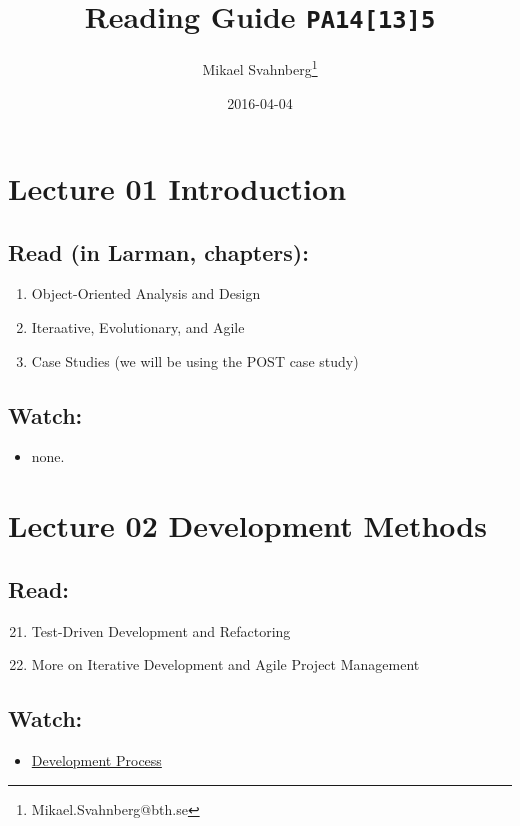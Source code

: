 \documentclass[10pt,t,a4paper]{article}
\author{Mikael Svahnberg\thanks{Mikael.Svahnberg@bth.se}}
\date{2016-04-04}
\title{Reading Guide \texttt{PA14[13]5}}
\begin{document}
\maketitle


\section{Lecture 01 Introduction}
\label{sec:orgheadline3}
\subsection{Read (in Larman, chapters):}
\label{sec:orgheadline1}
\begin{enumerate}
\item Object-Oriented Analysis and Design
\item Iteraative, Evolutionary, and Agile
\item Case Studies (we will be using the POST case study)
\end{enumerate}

\subsection{Watch:}
\label{sec:orgheadline2}
\begin{itemize}
\item none.
\end{itemize}
\section{Lecture 02 Development Methods}
\label{sec:orgheadline6}
\subsection{Read:}
\label{sec:orgheadline4}
\begin{enumerate}
\setcounter{enumi}{20}
\item Test-Driven Development and Refactoring
\setcounter{enumi}{39}
\item More on Iterative Development and Agile Project Management
\end{enumerate}

\subsection{Watch:}
\label{sec:orgheadline5}
\begin{itemize}
\item \href{https://play.bth.se/media/Development+Process/1_gmy3m68z/41750261}{Development Process}
\end{itemize}
\end{document}
